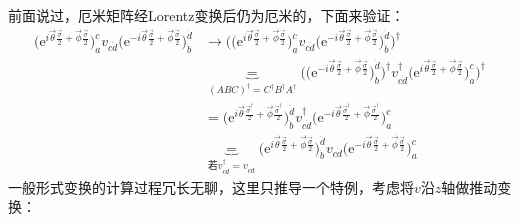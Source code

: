 前面说过，厄米矩阵经Lorentz变换后仍为厄米的，下面来验证：
\begin{align}
	\Big( \mathrm{e}^{ i \vec{\theta} \frac{ \vec{\sigma} }{2}  + \vec{\phi} \frac{\vec{\sigma}}{2}}  \Big)^c_a v_{c \dot{d}} \Big( \mathrm{e}^{ -i \vec{\theta} \frac{ \vec{\sigma} }{2}  + \vec{\phi} \frac{\vec{\sigma}}{2}}  \Big)^{\dot{d}}_{\dot{b}} & \rightarrow \Bigg( \Big( \mathrm{e}^{ i \vec{\theta} \frac{ \vec{\sigma} }{2}  + \vec{\phi} \frac{\vec{\sigma}}{2}}  \Big)^c_a v_{c \dot{d}} \Big( \mathrm{e}^{ -i \vec{\theta} \frac{ \vec{\sigma} }{2}  + \vec{\phi} \frac{\vec{\sigma}}{2}}  \Big)^{\dot{d}}_{\dot{b}} \Bigg)^\dag \nonumber \\
	&\underbrace{=}_{(ABC)^\dag = C^\dag B^\dag A^\dag} \bigg(  \Big( \mathrm{e}^{ -i \vec{\theta} \frac{ \vec{\sigma} }{2}  + \vec{\phi} \frac{\vec{\sigma}}{2}}  \Big)^{\dot{d}}_{\dot{b}}   \bigg)^\dag v^\dag_{c \dot{d}} \bigg(  \mathrm{e}^{ i \vec{\theta} \frac{ \vec{\sigma} }{2}  + \vec{\phi} \frac{\vec{\sigma}}{2}}  \Big)^c_a \bigg)^\dag \nonumber \\
	&= \bigg( \mathrm{e}^{ i \vec{\theta} \frac{ \vec{\sigma}^\dag }{2}  + \vec{\phi} \frac{\vec{\sigma}^\dag}{2}} \bigg)^{\dot{d}}_{\dot{b}} v^\dag_{c \dot{d}} \bigg(  \mathrm{e}^{ -i \vec{\theta} \frac{ \vec{\sigma}^\dag }{2}  + \vec{\phi} \frac{\vec{\sigma}^\dag}{2}}\bigg)^c_a \nonumber \\
\label{equ3.218}
	&\underbrace{=}_{\text{若} v^\dag_{c \dot{d}} = v_{c \dot{d}}} \bigg( \mathrm{e}^{ i \vec{\theta} \frac{ \vec{\sigma} }{2}  + \vec{\phi} \frac{\vec{\sigma}}{2}} \bigg)^{\dot{d}}_{\dot{b}} v_{c \dot{d}} \bigg(  \mathrm{e}^{ -i \vec{\theta} \frac{ \vec{\sigma} }{2}  + \vec{\phi} \frac{\vec{\sigma}}{2}}\bigg)^c_a
\end{align}
一般形式变换的计算过程冗长无聊，这里只推导一个特例，考虑将$v$沿$z$轴做推动变换：
